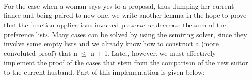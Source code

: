 {\begin{code}
\AgdaSymbol{)}\<%
\\
%
\>[37]\<%
\\
%
\>[37]\AgdaSymbol{(}\AgdaSpace{}%
\AgdaSymbol{)}\<%
\\
%
\>[37]\AgdaSymbol{(}\AgdaSpace{}%
\AgdaSymbol{)}\<%
\\
%
\>[37]\AgdaSymbol{(}\AgdaSpace{}%
\AgdaSymbol{)}\<%
\\
%
\>[30]\AgdaSymbol{)}\<%
\\
%
\>[17]\<%
\\
\>[17][@{}l@{\AgdaIndent{0}}]%
\>[30]\AgdaSymbol{(}\AgdaSpace{}%
\AgdaSymbol{(}\AgdaSpace{}%
\AgdaSymbol{\AgdaUnderscore{}))}\<%
\\
%
\>[17]\<%
\end{code}

For the case when a woman says yes to a proposal, thus dumping her current fiance and being paired to new one, we write another lemma in the hope to prove that the function applications involved preserve or decrease the sum of the preference lists. Many cases can be solved by using the semiring solver, since they involve some empty lists and we already know how to construct a (more convoluted proof) that n $\le$ n + 1. Later, however, we must effectively implement the proof of the cases that stem from the comparison of the new suitor to the current husband. Part of this implementation is given below: 

}
